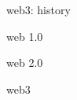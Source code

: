 

\begin{frame}{web3: history}
\begin{block}{}
web 1.0
\end{block}
\begin{block}{}
web 2.0
\end{block}
\begin{block}{}
web3
\end{block}
\end{frame}


